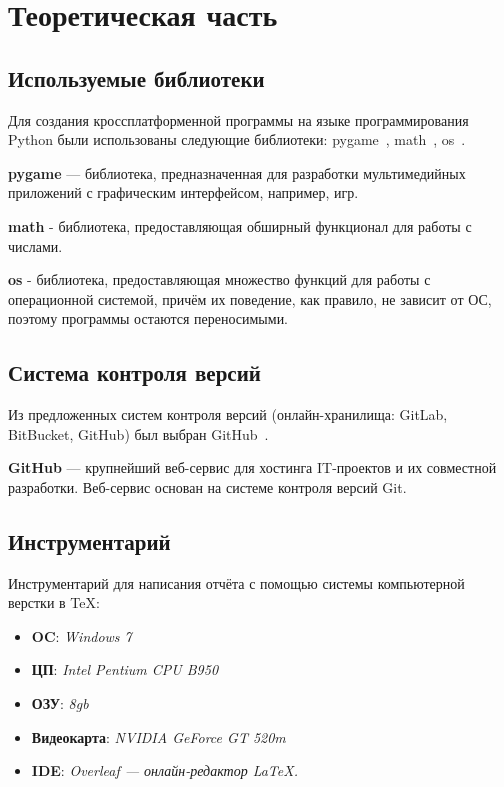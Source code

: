 \documentclass[14pt, oneside]{altsu-report}
\begin{document}

\chapter{Теоретическая часть}\label{ch1}
\section{Используемые библиотеки}
Для создания кроссплатформенной программы на языке программирования Python были использованы следующие библиотеки: pygame~\cite{wikiRUpygame}, math~\cite{docENmath}, os~\cite{docENos}.

\textbf{pygame} — библиотека, предназначенная для разработки мультимедийных приложений с графическим интерфейсом, например, игр.

\textbf{math} - библиотека, предоставляющая обширный функционал для работы с числами.

\textbf{os} - библиотека, предоставляющая множество функций для работы с операционной системой, причём их поведение, как правило, не зависит от ОС, поэтому программы остаются переносимыми.

\section{Система контроля версий}
Из предложенных систем контроля версий (онлайн-хранилища: GitLab, BitBucket, GitHub) был выбран GitHub~\cite{wikiRUGitHub}.

\textbf{GitHub} — крупнейший веб-сервис для хостинга IT-проектов и их совместной разработки. Веб-сервис основан на системе контроля версий Git.


\section{Инструментарий}
Инструментарий для написания отчёта с помощью системы компьютерной верстки в \TeX:
    \begin{itemize}
        \item \textbf{OC}: \textit{Windows 7}
        \item \textbf{ЦП}: \textit{Intel Pentium CPU B950}
        \item \textbf{ОЗУ}: \textit{8gb}
        \item \textbf{Видеокарта}: \textit{NVIDIA GeForce GT 520m}
        \item \textbf{IDE}: \textit{Overleaf — онлайн-редактор LaTeX.}
    \end{itemize}
\end{document}
